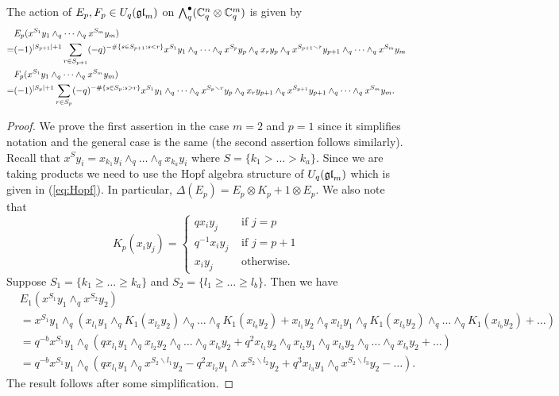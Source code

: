\documentclass[10pt,leqno]{article}
\begin{document}
\begin{lem}
The action of $E_p,F_p \in U_q({\mathfrak{gl}}_m)$ on $\bigwedge_q^\bullet ({\mathbb{C}}_q^n \otimes {\mathbb{C}}_q^m)$ is given by 
\begin{align} \label{eq:Eaction}
& E_p (x^{S_1} y_1 \wedge_q \cdots \wedge_q x^{S_m}y_m)  \\
=& (-1)^{|S_{p+1}|+1} \sum_{r \in S_{p+1}} (-q)^{- \# \{s \in S_{p+1}: s < r \}} x^{S_1} y_1 \wedge_q \cdots \wedge_q x^{S_p} y_p \wedge_q x_r y_p \wedge_q x^{S_{p+1} \smallsetminus r} y_{p+1} \wedge_q \cdots \wedge_q x^{S_m} y_m \notag \\
\label{eq:Faction}
& F_p (x^{S_1} y_1 \wedge_q \cdots \wedge_q x^{S_m}y_m) \\
=& (-1)^{|S_p|+1} \sum_{r \in S_p} (-q)^{- \#\{s \in S_p: s > r \}} x^{S_1} y_1 \wedge_q \cdots \wedge_q x^{S_p \smallsetminus r} y_p \wedge_q x_r y_{p+1} \wedge_q x^{S_{p+1}} y_{p+1} \wedge_q \cdots \wedge_q x^{S_m} y_m. \notag
\end{align}
\end{lem}
\begin{proof}
We prove the first assertion in the case $m=2$ and $p=1$ since it simplifies notation and the general case is the same (the second assertion follows similarly). Recall that $x^Sy_i = x_{k_1}y_i \wedge_q \dots \wedge_q x_{k_a}y_i$ where $S = \{k_1 > \dots > k_a\}$. Since we are taking products we need to use the Hopf algebra structure of $U_q({\mathfrak{gl}}_m)$ which is given in (\ref{eq:Hopf}). In particular, $\Delta(E_p) = E_p \otimes K_p + 1 \otimes E_p$. We also note that 
$$K_p(x_iy_j) = 
\begin{cases}
q x_iy_j & \text{ if } j=p \\
q^{-1} x_iy_j & \text{ if } j=p+1 \\
x_iy_j & \text{ otherwise.}
\end{cases}$$
Suppose $S_1 = \{k_1 \ge \dots \ge k_a\}$ and $S_2 = \{l_1 \ge \dots \ge l_b\}$. Then we have
\begin{align*}
& E_1(x^{S_1}y_1 \wedge_q x^{S_2}y_2) \\
&= x^{S_1}y_1 \wedge_q ( x_{l_1}y_1 \wedge_q K_1(x_{l_2}y_2) \wedge_q \dots \wedge_q K_1(x_{l_b}y_2) + x_{l_1}y_2 \wedge_q x_{l_2}y_1 \wedge_q K_1(x_{l_3}y_2) \wedge_q \dots \wedge_q K_1(x_{l_b}y_2) + \dots ) \\ 
&= q^{-b} x^{S_1}y_1 \wedge_q ( q x_{l_1}y_1 \wedge_q x_{l_2}y_2 \wedge_q \dots \wedge_q x_{l_b}y_2 + q^2 x_{l_1}y_2 \wedge_q x_{l_2}y_1 \wedge_q x_{l_3}y_2 \wedge_q \dots \wedge_q x_{l_b}y_2 + \dots) \\
&= q^{-b} x^{S_1}y_1 \wedge_q (qx_{l_1}y_1 \wedge_q x^{S_2 \smallsetminus l_1} y_2 - q^2 x_{l_2}y_1 \wedge x^{S_2 \smallsetminus l_2} y_2 + q^3 x_{l_3}y_1 \wedge_q x^{S_2 \smallsetminus l_3} y_2 - \dots ).
\end{align*}
The result follows after some simplification. 
\end{proof}
\end{document}

